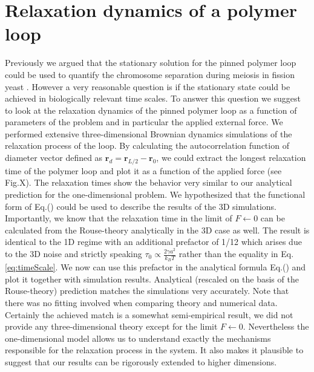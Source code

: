 \documentclass[aps,showpacs,twocolumn,floatfix,prx,superscriptaddress]{revtex4-1}
\begin{document}
\section{Relaxation dynamics of a polymer loop}
Previously we argued that the stationary solution for the pinned polymer loop could be used to quantify the chromosome separation during meiosis in fission yeast \cite{}. However a very reasonable question is if the stationary state could be achieved in biologically relevant time scales. To answer this question we suggest to look at the relaxation dynamics of the pinned polymer loop as a function of parameters of the problem and in particular the applied external force. We performed extensive three-dimensional Brownian dynamics simulations of the relaxation process of the loop. By calculating the autocorrelation function of diameter vector defined as $\mathbf{r}_d = \mathbf{r}_{L/2} - \mathbf{r}_0$, we could extract the longest relaxation time of the polymer loop and plot it as a function of the applied force (see Fig.X). The relaxation times show the behavior very similar to our analytical prediction for the one-dimensional problem. We hypothesized that the functional form of Eq.() could be used to describe the results of the 3D simulations. Importantly, we know that the relaxation time in the limit of $F\leftarrow 0$ can be calculated from the Rouse-theory analytically in the 3D case as well. The result is identical to the 1D regime with an additional prefactor of 1/12 which arises due to the 3D noise and strictly speaking $\tau_0\propto\frac{2\gamma a^2}{k_{B}T}$ rather than the equality in Eq. \eqref{eq:timeScale}. We now can use this prefactor in the analytical formula Eq.() and plot it together with simulation results. Analytical (rescaled on the basis of the Rouse-theory) prediction matches the simulations very accurately. Note that there was no fitting involved when comparing theory and numerical data. Certainly the achieved match is a somewhat semi-empirical result, we did not provide any three-dimensional theory except for the limit $F\leftarrow 0$. Nevertheless the one-dimensional model allows us to understand exactly the mechanisms responsible for the relaxation process in the system. It also makes it plausible to suggest that our results can be rigorously extended to higher dimensions.
\end{document}
